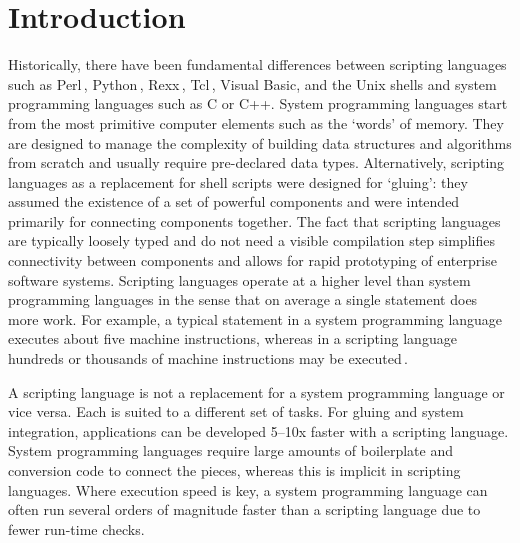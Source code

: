 \documentclass[12pt]{article}
\begin{document}

\section{Introduction}

Historically, there have been fundamental differences between
scripting languages such as
Perl\,\cite{wall99:_perl_progr_refer_guide},
Python\,\cite{martelli06:_python_nutsh},
Rexx\,\cite{o'hara88:_moder_progr_using_rexx},
Tcl\,\cite{ousterhout94:_tcl_tk_toolk}, Visual Basic, and the Unix
shells and system programming languages such as C or C++.  System
programming languages start from the most primitive computer elements
such as the `words' of memory. They are designed to manage the complexity of
building data structures and algorithms from scratch and usually
require pre-declared data types.  Alternatively, scripting languages
as a replacement for shell scripts were designed for `gluing': they
assumed the existence of a set of powerful components and were
intended primarily for connecting components together. The fact that
scripting languages are typically loosely typed and do not need a
visible compilation step simplifies connectivity between components
and allows for rapid prototyping of enterprise software systems.
Scripting languages operate at a higher level than system programming
languages in the sense that on average a single statement does more
work. For example, a typical statement in a system programming
language executes about five machine instructions, whereas in a
scripting language hundreds or thousands of machine instructions may
be executed\,\cite{ousterhout98:_scrip}.


A scripting language is not a replacement for a system programming
language or vice versa. Each is suited to a different set of tasks.
For gluing and system integration, applications can be developed
5--10x faster with a scripting language. System programming languages
require large amounts of boilerplate and conversion code to connect
the pieces, whereas this is implicit in scripting languages. Where
execution speed is key, a system programming language can often run
several orders of magnitude faster than a scripting language due to
fewer run-time checks.
\end{document}
